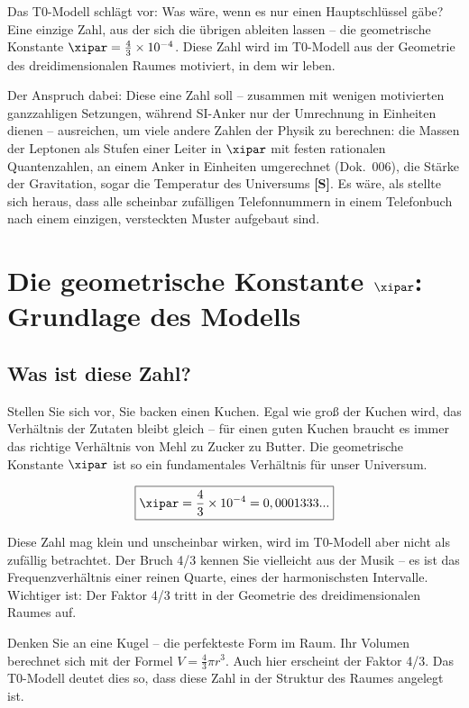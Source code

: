 	\begin{revolutionary}[Kernidee]
		Das T0-Modell schlägt vor: Was wäre, wenn es nur einen Hauptschlüssel gäbe? Eine einzige Zahl, aus der sich die übrigen ableiten lassen -- die geometrische Konstante $\xipar = \frac{4}{3} \times 10^{-4}$. Diese Zahl wird im T0-Modell aus der Geometrie des dreidimensionalen Raumes motiviert, in dem wir leben.
	\end{revolutionary}
	
	Der Anspruch dabei: Diese eine Zahl soll -- zusammen mit wenigen motivierten ganzzahligen Setzungen, während SI-Anker nur der Umrechnung in Einheiten dienen -- ausreichen, um viele andere Zahlen der Physik zu berechnen: die Massen der Leptonen als Stufen einer Leiter in $\xipar$ mit festen rationalen Quantenzahlen, an einem Anker in Einheiten umgerechnet (Dok.~006), die Stärke der Gravitation, sogar die Temperatur des Universums \textbf{[S]}. Es wäre, als stellte sich heraus, dass alle scheinbar zufälligen Telefonnummern in einem Telefonbuch nach einem einzigen, versteckten Muster aufgebaut sind.
	
	\section{Die geometrische Konstante $\xipar$: Grundlage des Modells}
	
	\subsection{Was ist diese Zahl?}
	
	Stellen Sie sich vor, Sie backen einen Kuchen. Egal wie groß der Kuchen wird, das Verhältnis der Zutaten bleibt gleich -- für einen guten Kuchen braucht es immer das richtige Verhältnis von Mehl zu Zucker zu Butter. Die geometrische Konstante $\xipar$ ist so ein fundamentales Verhältnis für unser Universum.
	
	\begin{equation}
		\boxed{\xipar = \frac{4}{3} \times 10^{-4} = 0,0001333...}
	\end{equation}
	
	Diese Zahl mag klein und unscheinbar wirken, wird im T0-Modell aber nicht als zufällig betrachtet. Der Bruch 4/3 kennen Sie vielleicht aus der Musik -- es ist das Frequenzverhältnis einer reinen Quarte, eines der harmonischsten Intervalle. Wichtiger ist: Der Faktor 4/3 tritt in der Geometrie des dreidimensionalen Raumes auf.
	
	Denken Sie an eine Kugel -- die perfekteste Form im Raum. Ihr Volumen berechnet sich mit der Formel $V = \frac{4}{3}\pi r^3$. Auch hier erscheint der Faktor 4/3. Das T0-Modell deutet dies so, dass diese Zahl in der Struktur des Raumes angelegt ist.
	
